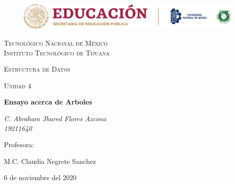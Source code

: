 \documentclass[letterpaper, 12pt]{article}
\begin{document}
    
    \begin{titlepage}
        \begin{figure}[ht]
            \centering
            \includegraphics[width=15cm]{logosITT.png}
        \end{figure}
        \centering
        {\scshape\LARGE Tecnológico Nacional de México\\Instituto Tecnológico de Tijuana\par}
        \vspace{1cm}
        {\scshape\Large Estructura de Datos\par}
        \vspace{1cm}
        {\scshape\Large Unidad 4\par}
        \vspace{1.5cm}
        {\huge\bfseries Ensayo acerca de Arboles\par}
        \vspace{2cm}
        {\Large\itshape C. Abraham Jhared Flores Azcona\\19211640\par}
        \vfill
        Profesora: \par
        M.C. Claudia Negrete Sanchez
        
        \vfill

        {\large 6 de noviembre del 2020}
    \end{titlepage}
\end{document}

